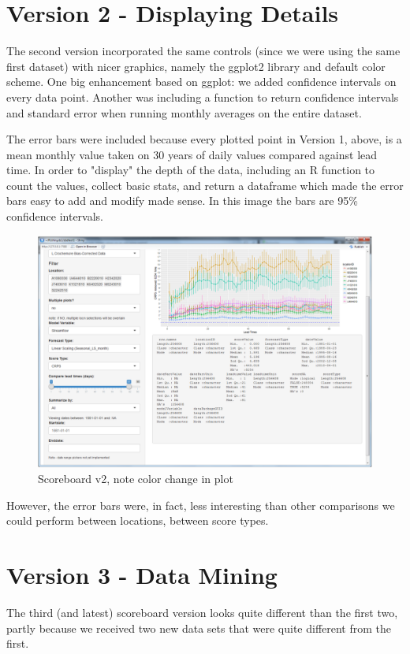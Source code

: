 \documentclass[logos,parttoc,morelanguage=french,morelanguage=german]{orsay-memoire}
\begin{document}
\section{Version 2 - Displaying Details}

The second version incorporated the same controls (since we were using the same first dataset) with nicer graphics, namely the  \gls{ggplot2} library and default color scheme. One big enhancement based on ggplot: we added confidence intervals on every data point. Another was including a function to return confidence intervals and standard error when running monthly averages on the entire dataset.

The error bars were included because every plotted point in Version 1, above, is a mean monthly value taken on 30 years of daily values compared against lead time. In order to "display" the depth of the data, including an R function to count the values, collect basic stats, and return a dataframe which made the error bars easy to add and modify made sense. In this image the bars are 95\% confidence intervals.

\begin{figure}[H]
\centering
\includegraphics[width=0.7\linewidth]{images/sbdV2v24notes.png}
  \caption{Scoreboard v2, note color change in plot}
  \label{fig:scoreboard v2}
\end{figure}

However, the error bars were, in fact, less interesting than other comparisons we could perform between locations, between score types.

\section{Version 3 - Data Mining}

The third (and latest) scoreboard version looks quite different than the first two, partly because we received two new data sets that were quite different from the first.
\end{document}
